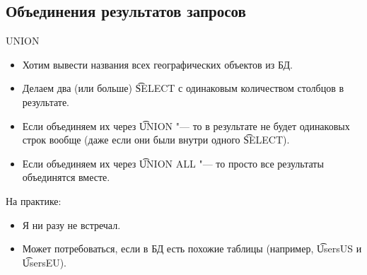 \subsection{Объединения результатов запросов}
\begin{frame}
\end{frame}

\begin{frame}{UNION}
	\begin{itemize}
		\item Хотим вывести названия всех географических объектов из БД.
		\item Делаем два (или больше) \t{SELECT} с одинаковым количеством столбцов в результате.
		\item Если объединяем их через \t{UNION} "--- то в результате не будет одинаковых строк вообще (даже если они были внутри одного \t{SELECT}).
		\item Если объединяем их через \t{UNION ALL} "--- то просто все результаты объединятся вместе.
	\end{itemize}
	На практике:
	\begin{itemize}
		\item Я ни разу не встречал.
		\item Может потребоваться, если в БД есть похожие таблицы (например, \t{UsersUS} и \t{UsersEU}).
	\end{itemize}
\end{frame}
